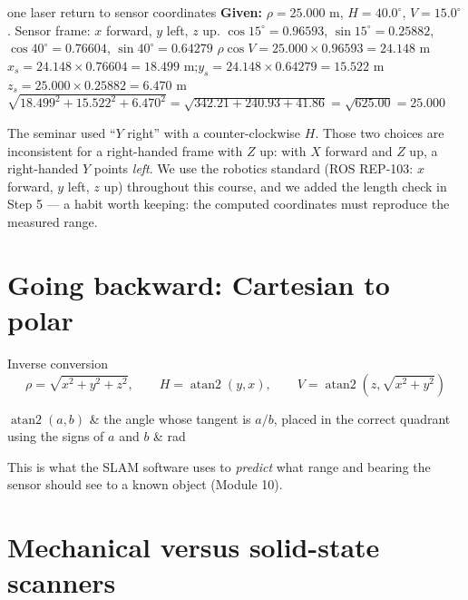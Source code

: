
\begin{worked}{one laser return to sensor coordinates}
\textbf{Given:} $\rho=25.000$ m, $H=40.0^\circ$, $V=15.0^\circ$. Sensor frame: $x$ forward, $y$ left, $z$ up.
 $\cos15^\circ=0.96593$, $\sin15^\circ=0.25882$, $\cos40^\circ=0.76604$, $\sin40^\circ=0.64279$
 $\rho\cos V=25.000\times0.96593=24.148$ m
 $x_s=24.148\times0.76604=18.499$ m;\quad $y_s=24.148\times0.64279=15.522$ m
 $z_s=25.000\times0.25882=6.470$ m
 $\sqrt{18.499^2+15.522^2+6.470^2}=\sqrt{342.21+240.93+41.86}=\sqrt{625.00}=25.000$ \checkmark
{}
\end{worked}

\begin{improve}
The seminar used ``$Y$ right'' with a counter-clockwise $H$. Those two choices are inconsistent for a right-handed frame with $Z$ up: with $X$ forward and $Z$ up, a right-handed $Y$ points \emph{left}. We use the robotics standard (ROS REP-103: $x$ forward, $y$ left, $z$ up) throughout this course, and we added the length check in Step 5 --- a habit worth keeping: the computed coordinates must reproduce the measured range.
\end{improve}

\section{Going backward: Cartesian to polar}
\begin{keyeq}{Inverse conversion}
\[ \rho=\sqrt{x^2+y^2+z^2},\qquad H=\operatorname{atan2}(y,x),\qquad V=\operatorname{atan2}\!\left(z,\sqrt{x^2+y^2}\right) \]
\begin{symbols}
$\operatorname{atan2}(a,b)$ & the angle whose tangent is $a/b$, placed in the correct quadrant using the signs of $a$ and $b$ & rad\\
\end{symbols}
\end{keyeq}
This is what the SLAM software uses to \emph{predict} what range and bearing the sensor should see to a known object (Module 10).

\section{Mechanical versus solid-state scanners}

